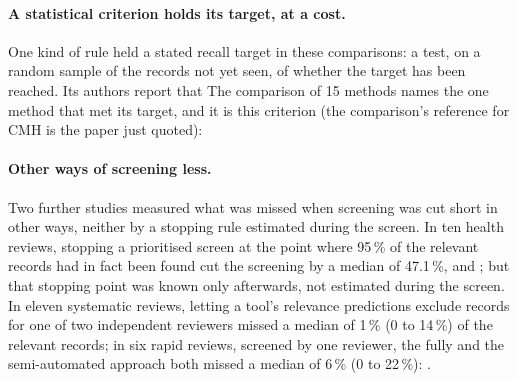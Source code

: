 \paragraph{A statistical criterion holds its target, at a cost.}
One kind of rule held a stated recall target in these comparisons: a
test, on a random sample of the records not yet seen, of whether the
target has been reached.
Its authors report that
The comparison of 15 methods names the one method that met its target,
and it is this criterion (the comparison's reference for CMH is the
paper just quoted):

\paragraph{Other ways of screening less.}
Two further studies measured what was missed when screening was cut
short in other ways, neither by a stopping rule estimated during the
screen.
In ten health reviews, stopping a prioritised screen at the point where
95\,\% of the relevant records had in fact been found cut the screening
by a median of 47.1\,\%, and ; but that
stopping point was known only afterwards, not estimated during the
screen.
In eleven systematic reviews, letting a tool's relevance predictions
exclude records for one of two independent reviewers missed a median of
1\,\% (0 to 14\,\%) of the relevant records; in six rapid reviews,
screened by one reviewer, the fully and the semi-automated approach both
missed a median of 6\,\% (0 to 22\,\%):
.

